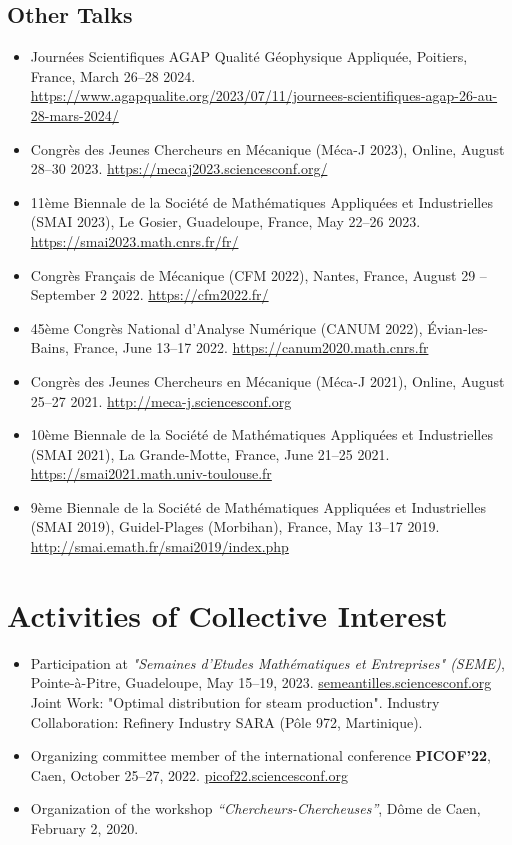 \documentclass[10pt]{article} %
\begin{document}
\subsection{Other Talks}
\begin{itemize}
\item Journées Scientifiques AGAP Qualité Géophysique Appliquée, Poitiers, France, March 26--28 2024. \url{https://www.agapqualite.org/2023/07/11/journees-scientifiques-agap-26-au-28-mars-2024/}
\item Congrès des Jeunes Chercheurs en Mécanique (Méca-J 2023), Online, August 28--30 2023. \url{https://mecaj2023.sciencesconf.org/}
\item 11ème Biennale de la Société de Mathématiques Appliquées et Industrielles (SMAI 2023), Le Gosier, Guadeloupe, France, May 22--26 2023. \url{https://smai2023.math.cnrs.fr/fr/}
\item Congrès Français de Mécanique (CFM 2022), Nantes, France, August 29 -- September 2 2022. \url{https://cfm2022.fr/}
\item 45ème Congrès National d'Analyse Numérique (CANUM 2022), Évian-les-Bains, France, June 13--17 2022. \url{https://canum2020.math.cnrs.fr}
\item Congrès des Jeunes Chercheurs en Mécanique (Méca-J 2021), Online, August 25--27 2021. \url{http://meca-j.sciencesconf.org}
\item 10ème Biennale de la Société de Mathématiques Appliquées et Industrielles (SMAI 2021), La Grande-Motte, France, June 21--25 2021. \url{https://smai2021.math.univ-toulouse.fr}
\item 9ème Biennale de la Société de Mathématiques Appliquées et Industrielles (SMAI 2019), Guidel-Plages (Morbihan), France, May 13--17 2019. \url{http://smai.emath.fr/smai2019/index.php}
\end{itemize}

\section{Activities of Collective Interest}

\begin{itemize}
  \item Participation at \textit{"Semaines d'Etudes Mathématiques et Entreprises" (SEME)},  
  Pointe-à-Pitre, Guadeloupe, May 15–19, 2023.  
  \href{https://semeantilles.sciencesconf.org/}{semeantilles.sciencesconf.org}  
  Joint Work: "Optimal distribution for steam production".
  Industry Collaboration: Refinery Industry SARA (Pôle 972, Martinique).

  \item Organizing committee member of the international conference \textbf{PICOF’22},  
  Caen, October 25–27, 2022.  
  \href{https://picof22.sciencesconf.org/}{picof22.sciencesconf.org}

  \item Organization of the workshop \textit{“Chercheurs-Chercheuses”},  
  Dôme de Caen, February 2, 2020.
\end{itemize}
\end{document}
